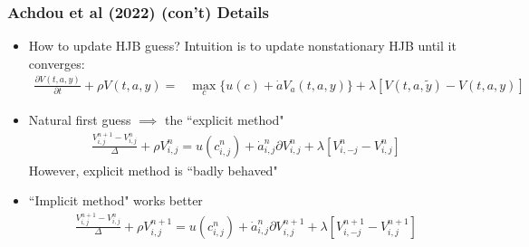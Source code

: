 \documentclass[usenames,dvipsnames, handout, aspectratio=169]{beamer}
\begin{document}
\begin{frame}[label = achdou_details_3]
\frametitle{Achdou et al (2022) (con't) Details}
\small
\begin{itemize}
\item How to update HJB guess? Intuition is to update nonstationary HJB until it converges:
\begin{align*}
\frac{\partial V(t,a,y)}{\partial t} + \rho V(t, a, y) =& \max_c \{u(c) + \dot a V_a(t, a, y) \} + \lambda [V(t, a, \tilde y) - V(t, a, y)]
\end{align*}
\item Natural first guess $\implies$ the ``explicit method"
\begin{align*}
\frac{V_{i,j}^{n+1} - V_{i,j}^n}{\Delta} + \rho V_{i,j}^n = u(c_{i,j}^n) + \dot a_{i,j}^n \partial V_{i,j}^n + \lambda [V_{i,-j}^n - V_{i,j}^n]
\end{align*}
However, explicit method is ``badly behaved"
\item ``Implicit method" works better
\begin{align*}
\frac{V_{i,j}^{n+1} - V_{i,j}^n}{\Delta} + \rho V_{i,j}^{n+1} = u(c_{i,j}^n) + \dot a_{i,j}^n \partial V_{i,j}^{n+1} + \lambda [V_{i,-j}^{n+1} - V_{i,j}^{n+1}]
\end{align*}
\end{itemize}
\hyperlink{achdou_summary}{}
\end{frame}
\end{document}

